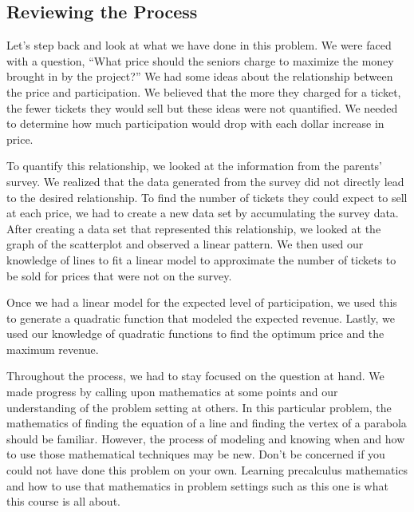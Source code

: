 \documentclass[10pt,]{book}
\theoremstyle{ptxdefinitionnotitle}
\theoremstyle{ptxdefinitiontitle}
\numberwithin{equation}{section}
\begin{document}
\subsection[{Reviewing the Process}]{Reviewing the Process}\label{subsection-2}
\hypertarget{p-31}{}%
Let’s step back and look at what we have done in this problem. We were faced with a question, “What price should the seniors charge to maximize the money brought in by the project?” We had some ideas about the relationship between the price and participation. We believed that the more they charged for a ticket, the fewer tickets they would sell but these ideas were not quantified. We needed to determine how much participation would drop with each dollar increase in price.%
\par
\hypertarget{p-32}{}%
To quantify this relationship, we looked at the information from the parents’ survey. We realized that the data generated from the survey did not directly lead to the desired relationship. To find the number of tickets they could expect to sell at each price, we had to create a new data set by accumulating the survey data. After creating a data set that represented this relationship, we looked at the graph of the scatterplot and observed a linear pattern. We then used our knowledge of lines to fit a linear model to approximate the number of tickets to be sold for prices that were not on the survey.%
\par
\hypertarget{p-33}{}%
Once we had a linear model for the expected level of participation, we used this to generate a quadratic function that modeled the expected revenue. Lastly, we used our knowledge of quadratic functions to find the optimum price and the maximum revenue.%
\par
\hypertarget{p-34}{}%
Throughout the process, we had to stay focused on the question at hand. We made progress by calling upon mathematics at some points and our understanding of the problem setting at others. In this particular problem, the mathematics of finding the equation of a line and finding the vertex of a parabola should be familiar. However, the process of modeling and knowing when and how to use those mathematical techniques may be new. Don’t be concerned if you could not have done this problem on your own. Learning precalculus mathematics and how to use that mathematics in problem settings such as this one is what this course is all about.%
\typeout{************************************************}
\typeout{************************************************}
\end{document}
